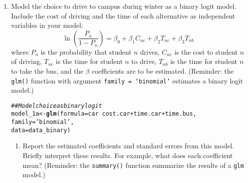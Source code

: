 \documentclass[11pt,letterpaper]{article}\usepackage[]{graphicx}\usepackage[]{xcolor}
\makeatletter
\newcommand{\hlstr}[1]{\textcolor[rgb]{0.192,0.494,0.8}{#1}}%
\newcommand{\hlcom}[1]{\textcolor[rgb]{0.678,0.584,0.686}{\textit{#1}}}%
\newcommand{\hlopt}[1]{\textcolor[rgb]{0,0,0}{#1}}%
\newcommand{\hlstd}[1]{\textcolor[rgb]{0.345,0.345,0.345}{#1}}%
\newcommand{\hlkwb}[1]{\textcolor[rgb]{0.69,0.353,0.396}{#1}}%
\newcommand{\hlkwc}[1]{\textcolor[rgb]{0.333,0.667,0.333}{#1}}%
\newcommand{\hlkwd}[1]{\textcolor[rgb]{0.737,0.353,0.396}{\textbf{#1}}}%
\newenvironment{kframe}{%
 \def\at@end@of@kframe{}%
 \ifinner\ifhmode%
  \def\at@end@of@kframe{\end{minipage}}%
  \begin{minipage}{\columnwidth}%
 \fi\fi%
 \def\FrameCommand##1{\hskip\@totalleftmargin \hskip-\fboxsep
 \colorbox{shadecolor}{##1}\hskip-\fboxsep
     \hskip-\linewidth \hskip-\@totalleftmargin \hskip\columnwidth}%
 \MakeFramed {\advance\hsize-\width
   \@totalleftmargin\z@ \linewidth\hsize
   \@setminipage}}%
 {\par\unskip\endMakeFramed%
 \at@end@of@kframe}
\newenvironment{knitrout}{}{} %
\makeatother
\begin{document}
\begin{enumerate}[label=\alph*., leftmargin=*]
	\item Model the choice to drive to campus during winter as a binary logit model. Include the cost of driving and the time of each alternative as independent variables in your model:
	$$\ln \left( \frac{P_n}{1 - P_n} \right) = \beta_0 + \beta_1 C_{nc} + \beta_2 T_{nc} + \beta_3 T_{nb}$$
	where $P_n$ is the probability that student $n$ drives, $C_{nc}$ is the cost to student $n$ of driving, $T_{nc}$ is the time for student $n$ to drive, $T_{nb}$ is the time for student $n$ to take the bus, and the $\beta$ coefficients are to be estimated. (Reminder: the \texttt{glm()} function with argument \texttt{family = `binomial'} estimates a binary logit model.)

\begin{knitrout}
\color{fgcolor}\begin{kframe}
\begin{alltt}
\hlcom{## Model choice as binary logit}
\hlstd{model_1a} \hlkwb{<-} \hlkwd{glm}\hlstd{(}\hlkwc{formula} \hlstd{= car} \hlopt{~} \hlstd{cost.car} \hlopt{+} \hlstd{time.car} \hlopt{+} \hlstd{time.bus,}
                \hlkwc{family} \hlstd{=} \hlstr{'binomial'}\hlstd{,}
                \hlkwc{data} \hlstd{= data_binary)}
\end{alltt}
\end{kframe}
\end{knitrout}

	\begin{enumerate}[label=\roman*.]
		\item Report the estimated coefficients and standard errors from this model. Briefly interpret these results. For example, what does each coefficient mean? (Reminder: the \texttt{summary()} function summarize the results of a \texttt{glm} model.)


\end{enumerate}
\end{enumerate}
\end{document}
